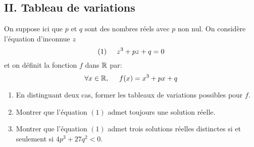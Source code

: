 \subsection*{II. Tableau de variations}
On suppose ici que $p$ et $q$ sont des nombres réels avec $p$ non nul. On considère l'équation d'inconnue $z$ 
\begin{displaymath}
 (1)\hspace{0.5cm} z^3+pz+q=0
\end{displaymath}
et on définit la fonction $f$ dans $\mathbb{R}$ par:
\begin{displaymath}
 \forall x\in\mathbb{R}, \hspace{0.5cm} f(x) = x^3+px+q
\end{displaymath}
\begin{enumerate}
 \item En distinguant deux cas, former les tableaux de variations possibles pour $f$.
 \item Montrer que l'équation $(1)$ admet toujours une solution réelle.
 \item Montrer que l'équation $(1)$ admet trois solutions réelles distinctes si et seulement si $4p^3+27q^2<0$.
\end{enumerate}
